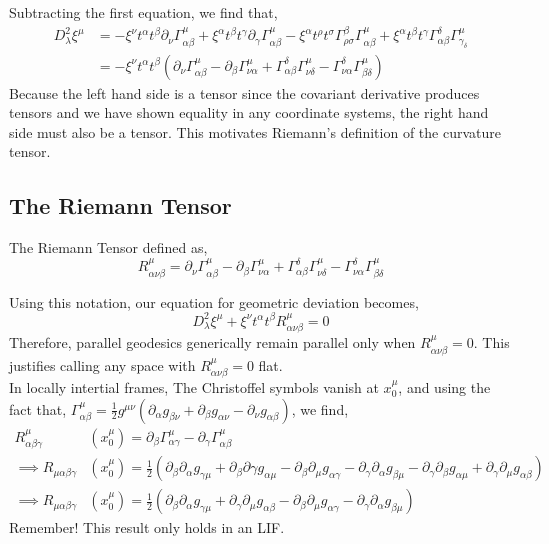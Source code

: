 \documentclass[11pt, a4paper]{article}
\begin{document}
Subtracting the first equation, we find that, 
\begin{align*}
D_\lambda^2 \xi^\mu & = -\xi^\nu t^\alpha t^\beta \partial_\nu \Gamma^\mu_{\alpha\beta} + \xi^\alpha t^\beta t^\gamma \partial_{\gamma}\Gamma^\mu_{\alpha\beta} - \xi^\alpha t^\rho t^\sigma \Gamma^\beta_{\rho\sigma}\Gamma^\mu_{\alpha\beta} + \xi^\alpha t^\beta t^\gamma\Gamma^\delta_{\alpha\beta}\Gamma^\mu_{\gamma_\delta}
\\
& = - \xi^\nu t^\alpha t^\beta \left( \partial_{\nu} \Gamma^\mu_{\alpha \beta} - \partial_{\beta} \Gamma^\mu_{\nu \alpha} + \Gamma^{\delta}_{\alpha \beta} \Gamma^{\mu}_{\nu \delta} - \Gamma^\delta_{\nu \alpha} \Gamma^\mu_{\beta \delta} \right)
\end{align*}
Because the left hand side is a tensor since the covariant derivative produces tensors and we have shown equality in any coordinate systems, the right hand side must also be a tensor. This motivates Riemann's definition of the curvature tensor. 
\subsection{The Riemann Tensor}

\begin{definition}
The Riemann Tensor defined as, 
\[R^\mu_{\alpha \nu \beta} = \partial_{\nu} \Gamma^\mu_{\alpha \beta} - \partial_{\beta} \Gamma^\mu_{\nu \alpha} + \Gamma^{\delta}_{\alpha \beta} \Gamma^{\mu}_{\nu \delta} - \Gamma^\delta_{\nu \alpha} \Gamma^\mu_{\beta \delta} \]
\end{definition}
\noindent
Using this notation, our equation for geometric deviation becomes,
\[ D_\lambda^2 \xi^\mu + \xi^\nu t^\alpha t^\beta R^\mu_{\alpha \nu \beta} = 0\]
Therefore, parallel geodesics generically remain parallel only when $R^\mu_{\alpha \nu \beta} = 0$. This justifies calling any space with $R^\mu_{\alpha \nu \beta} = 0$ flat.
\\
In locally intertial frames, The Christoffel symbols vanish at $x_0^\mu$, and using the fact that, $\Gamma^\mu_{\alpha\beta} = \frac{1}{2}g^{\mu\nu}\left(\partial_\alpha g_{\beta\nu}+\partial_\beta g_{\alpha\nu} - \partial_\nu g_{\alpha\beta}\right)$, 
we find, 
\begin{align*}R^\mu_{\alpha\beta\gamma}&\left(x^\mu_0\right) = \partial_\beta\Gamma^\mu_{\alpha\gamma} - \partial_\gamma\Gamma^\mu_{\alpha\beta}
\\
\implies R_{\mu\alpha\beta\gamma} &(x^\mu_0) = \frac{1}{2}\left(\partial_\beta \partial_\alpha g_{\gamma\mu} + \partial_\beta \partial \gamma g_{\alpha\mu} - \partial_\beta \partial_\mu g_{\alpha\gamma} - \partial_\gamma\partial_\alpha g_{\beta\mu} - \partial_\gamma\partial_\beta g_{\alpha\mu} + \partial_\gamma\partial_\mu g_{\alpha\beta}\right)
\\
\implies  R_{\mu\alpha\beta\gamma} &(x^\mu_0) =\frac{1}{2}\left(\partial_\beta\partial_\alpha g_{\gamma\mu} + \partial_\gamma\partial_\mu g_{\alpha\beta} - \partial_\beta\partial_\mu g_{\alpha\gamma} - \partial_\gamma\partial_\alpha g_{\beta\mu}\right)
\end{align*}
Remember!  This result only holds in an LIF.
\end{document}
